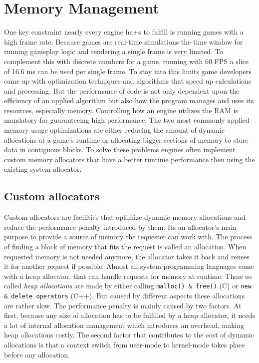 \section{Memory Management}

One key constraint nearly every engine ha+s to fulfill is running games with a high frame rate. Because games are real-time simulations the time window for running gameplay logic and rendering a single frame is very limited. To complement this with discrete numbers for a game, running with 60 \ac{FPS} a slice of 16.6 ms can be used per single frame. To stay into this limits game developers came up with optimization techniques and algorithms that speed up calculations and processing. But the performance of code is not only dependent upon the efficiency of an applied algorithm but also how the program manages and uses its resources, especially memory. Controlling how an engine utilizes the \ac{RAM} is mandatory for guaranteeing high performance. The two most commonly applied memory usage optimizations are either reducing the amount of dynamic allocations at a game's runtime or allocating bigger sections of memory to store data in contiguous blocks. To solve these problems engines often implement custom memory allocators that have a better runtime performance then using the existing system allocator.

\subsection{Custom allocators}

Custom allocators are facilities that optimize dynamic memory allocations and reduce the performance penalty introduced by them. Its an allocator's main purpose to provide a source of memory the requester can work with. The process of finding a block of memory that fits the request is called an allocation. When requested memory is not needed anymore, the allocator takes it back and reuses it for another request if possible.
Almost all system programming languages come with a heap allocator, that can handle requests for memory at runtime. These so called \textit{heap allocations} are made by either calling \texttt{malloc() \& free()} (C) or \texttt{new \& delete operators} (C++). But caused by different aspects these allocations are rather slow. The performance penalty is mainly caused by two factors. At first, because any size of allocation has to be fulfilled by a heap allocator, it needs a lot of internal allocation management which introduces an overhead, making heap allocations costly. The second factor that contributes to the cost of dynamic allocations is that a context switch from user-mode to kernel-mode takes place before any allocation. 

